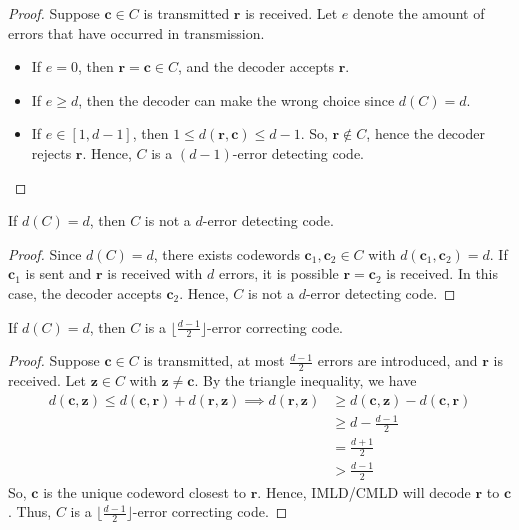 \begin{proof}
    Suppose $ \bm{c}\in C $ is transmitted $ \bm{r} $ is received. Let
    $ e $ denote the amount of errors that have occurred in transmission.
    \begin{itemize}
        \item If $ e = 0 $, then $ \bm{r}=\bm{c}\in C $, and the decoder accepts
              $ \bm{r} $.
        \item If $ e \geq d $, then the decoder can make the wrong
              choice since $ d(C)=d $.
        \item If $ e\in[1,d-1] $, then
              $ 1\leqslant d(\bm{r},\bm{c})\leqslant d-1 $.
              So, $ \bm{r}\notin C $, hence the decoder
              rejects $ \bm{r} $. Hence, $ C $ is a $ (d-1) $-error detecting code.
    \end{itemize}
\end{proof}

\begin{thmbox}
    \begin{theorem}
        If $ d(C)=d $, then $ C $ is not a $ d $-error detecting code.
    \end{theorem} \end{thmbox}

\begin{proof}
    Since $ d(C)=d $, there exists codewords $ \bm{c}_1,\bm{c}_2\in C $
    with $ d(\bm{c}_1,\bm{c}_2)=d $. If $ \bm{c}_1 $ is sent and $ \bm{r} $
    is received with $ d $ errors, it is possible $ \bm{r}=\bm{c}_2 $
    is received. In this case, the decoder accepts $ \bm{c}_2 $.
    Hence, $ C $ is not a $ d $-error detecting code.
\end{proof}

\begin{thmbox}
    \begin{theorem}
        If $ d(C)=d $, then $ C $ is a $ \lfloor \frac{d-1}{2} \rfloor $-error
        correcting code.
    \end{theorem} \end{thmbox}

\begin{proof}
    Suppose $ \bm{c}\in C $ is transmitted, at most $ \frac{d-1}{2}  $ errors
    are introduced, and $ \bm{r} $ is received.
    Let $ \bm{z}\in C $ with $ \bm{z}\neq \bm{c} $.
    By the triangle inequality, we have
    \begin{align*}
        d(\bm{c},\bm{z})\leqslant d(\bm{c},\bm{r})+d(\bm{r},\bm{z})\implies
        d(\bm{r},\bm{z})
         & \geqslant d(\bm{c},\bm{z})-d(\bm{c},\bm{r}) \\
         & \geqslant d-\frac{d-1}{2}                   \\
         & =\frac{d+1}{2}                              \\
         & >\frac{d-1}{2}
    \end{align*}
    So, $ \bm{c} $ is the unique codeword closest to $ \bm{r} $. Hence, IMLD/CMLD
    will decode $ \bm{r} $ to $ \bm{c} $. Thus, $ C $ is a
    $ \lfloor \frac{d-1}{2} \rfloor $-error correcting code.
\end{proof}

